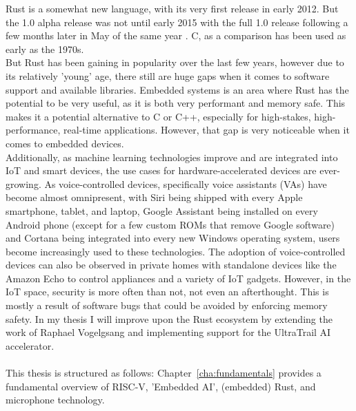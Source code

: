 
Rust \cite{rustlang} is a somewhat new language, with its very first release in early 2012.
But the 1.0 alpha release was not until early 2015 with the full 1.0 release following a few
months later in May of the same year \cite{rust_releases}.
C, as a comparison has been used as early as the 1970s.\\
But Rust has been gaining in popularity \cite{rust_popularity} over the last few years, however due to its relatively 'young' age,
there still are huge gaps when it comes to software support and available libraries.
Embedded systems is an area where Rust has the potential to be very useful, as it is both very performant and memory safe.
This makes it a potential alternative to C or C++, especially for high-stakes, high-performance, real-time applications.
However, that gap is very noticeable when it comes to embedded devices.\\
Additionally, as machine learning technologies improve and are integrated into IoT and smart devices,
the use cases for hardware-accelerated devices are ever-growing.
As voice-controlled devices, specifically voice assistants (VAs) have become almost omnipresent,
with Siri being shipped with every Apple smartphone, tablet, and laptop,
Google Assistant being installed on every Android phone (except for a few custom ROMs that remove Google software) and Cortana being integrated
into every new Windows operating system, users become increasingly used to these technologies.
The adoption of voice-controlled devices can also be observed in private homes with standalone devices
like the Amazon Echo to control appliances and a variety of IoT gadgets.
However, in the IoT space, security is more often than not, not even an afterthought.
This is mostly a result of software bugs that could be avoided by enforcing memory safety.
In my thesis I will improve upon the Rust ecosystem by extending the work of Raphael Vogelgsang \cite{rust_pulp}
and implementing support for the UltraTrail \cite{ultratrail} AI accelerator.
\\\\
This thesis is structured as follows:
Chapter~\ref{cha:fundamentals} provides a fundamental overview of RISC-V, 'Embedded AI', (embedded) Rust, and microphone technology.
